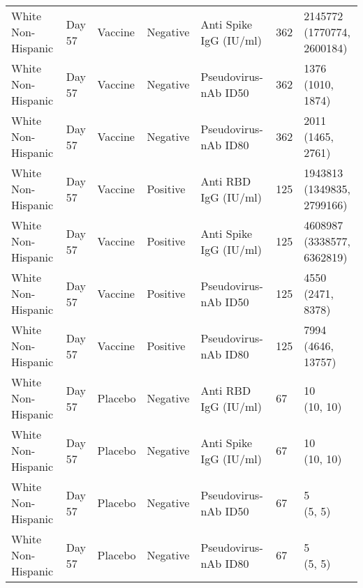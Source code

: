 \documentclass[]{book}
\theoremstyle{definition}
\theoremstyle{definition}
\theoremstyle{definition}
\newcommand{\1}{\mathbbm{1}}
\begin{document}
\begin{landscape}
\begin{ThreePartTable}
\begin{longtable}[t]{>{\raggedright\arraybackslash}p{7cm}llllll}
\hspace{1em}White Non-Hispanic & Day 57 & Vaccine & Negative & Anti Spike IgG (IU/ml) & 362 & \makecell[l]{2145772\\(1770774, 2600184)}\\
\hspace{1em}White Non-Hispanic & Day 57 & Vaccine & Negative & Pseudovirus-nAb ID50 & 362 & \makecell[l]{1376\\(1010, 1874)}\\
\hspace{1em}White Non-Hispanic & Day 57 & Vaccine & Negative & Pseudovirus-nAb ID80 & 362 & \makecell[l]{2011\\(1465, 2761)}\\
\hspace{1em}White Non-Hispanic & Day 57 & Vaccine & Positive & Anti RBD IgG (IU/ml) & 125 & \makecell[l]{1943813\\(1349835, 2799166)}\\
\hspace{1em}White Non-Hispanic & Day 57 & Vaccine & Positive & Anti Spike IgG (IU/ml) & 125 & \makecell[l]{4608987\\(3338577, 6362819)}\\
\hspace{1em}White Non-Hispanic & Day 57 & Vaccine & Positive & Pseudovirus-nAb ID50 & 125 & \makecell[l]{4550\\(2471, 8378)}\\
\hspace{1em}White Non-Hispanic & Day 57 & Vaccine & Positive & Pseudovirus-nAb ID80 & 125 & \makecell[l]{7994\\(4646, 13757)}\\
\hspace{1em}White Non-Hispanic & Day 57 & Placebo & Negative & Anti RBD IgG (IU/ml) & 67 & \makecell[l]{10\\(10, 10)}\\
\hspace{1em}White Non-Hispanic & Day 57 & Placebo & Negative & Anti Spike IgG (IU/ml) & 67 & \makecell[l]{10\\(10, 10)}\\
\hspace{1em}White Non-Hispanic & Day 57 & Placebo & Negative & Pseudovirus-nAb ID50 & 67 & \makecell[l]{5\\(5, 5)}\\
\hspace{1em}White Non-Hispanic & Day 57 & Placebo & Negative & Pseudovirus-nAb ID80 & 67 & \makecell[l]{5\\(5, 5)}\\

\end{longtable}
\end{ThreePartTable}
\end{landscape}
\end{document}
